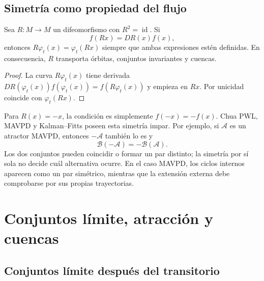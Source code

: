 \subsection{Simetría como propiedad del flujo}

\begin{proposition}
Sea \(R:M\to M\) un difeomorfismo con \(R^2=\operatorname{id}\). Si
\begin{equation}
 f(Rx)=DR(x)f(x),
 \label{geo:eq:equivariant-field}
\end{equation}
entonces \(R\varphi_t(x)=\varphi_t(Rx)\) siempre que ambas expresiones estén
definidas. En consecuencia, \(R\) transporta órbitas, conjuntos invariantes y
cuencas.
\end{proposition}

\begin{proof}
La curva \(R\varphi_t(x)\) tiene derivada
\(DR(\varphi_t(x))f(\varphi_t(x))=f(R\varphi_t(x))\) y empieza en \(Rx\).
Por unicidad coincide con \(\varphi_t(Rx)\).
\end{proof}

Para \(R(x)=-x\), la condición es simplemente \(f(-x)=-f(x)\). Chua PWL,
MAVPD y Kalman--Fitts poseen esta simetría impar. Por ejemplo, si
\(\mathcal A\) es un atractor MAVPD, entonces \(-\mathcal A\) también lo es y
\begin{equation}
 \mathcal B(-\mathcal A)=-\mathcal B(\mathcal A).
 \label{geo:eq:symmetric-basins}
\end{equation}
Los dos conjuntos pueden coincidir o formar un par distinto; la simetría por
sí sola no decide cuál alternativa ocurre. En el caso MAVPD, los ciclos
internos aparecen como un par simétrico, mientras que la extensión externa
debe comprobarse por sus propias trayectorias.

\fi
\HAFOGeoRenderBlocktrue
\ifdefined\HAFOGeoBlockSelect
  \HAFOGeoRenderBlockfalse
  \ifdefined\HAFOGeoBlockBasins\HAFOGeoRenderBlocktrue\fi
\fi
\ifHAFOGeoRenderBlock
\HAFOStudyNeedspace
\section{Conjuntos límite, atracción y cuencas}
\label{sec:geo-limit-basins}

\HAFOCardBasins

\subsection{Conjuntos límite después del transitorio}

